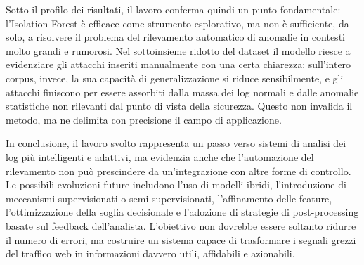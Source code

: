 Sotto il profilo dei risultati, il lavoro conferma quindi un punto fondamentale: l’Isolation Forest è efficace come strumento esplorativo, ma non è sufficiente, da solo, a risolvere il problema del rilevamento automatico di anomalie in contesti molto grandi e rumorosi. Nel sottoinsieme ridotto del dataset il modello riesce a evidenziare gli attacchi inseriti manualmente con una certa chiarezza; sull’intero corpus, invece, la sua capacità di generalizzazione si riduce sensibilmente, e gli attacchi finiscono per essere assorbiti dalla massa dei log normali e dalle anomalie statistiche non rilevanti dal punto di vista della sicurezza. Questo non invalida il metodo, ma ne delimita con precisione il campo di applicazione.

In conclusione, il lavoro svolto rappresenta un passo verso sistemi di analisi dei log più intelligenti e adattivi, ma evidenzia anche che l’automazione del rilevamento non può prescindere da un’integrazione con altre forme di controllo. Le possibili evoluzioni future includono l’uso di modelli ibridi, l’introduzione di meccanismi supervisionati o semi-supervisionati, l’affinamento delle feature, l’ottimizzazione della soglia decisionale e l’adozione di strategie di post-processing basate sul feedback dell’analista. L’obiettivo non dovrebbe essere soltanto ridurre il numero di errori, ma costruire un sistema capace di trasformare i segnali grezzi del traffico web in informazioni davvero utili, affidabili e azionabili.